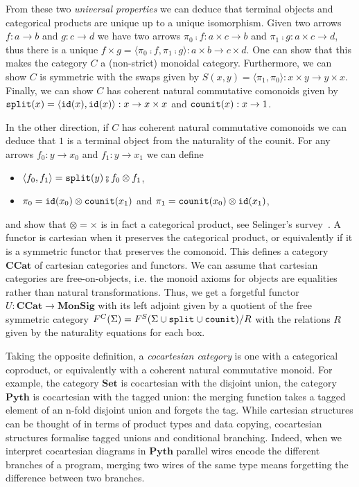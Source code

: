 From these two \emph{universal properties} we can deduce that terminal objects and categorical products are unique up to a unique isomorphism.
Given two arrows $f : a \to b$ and $g : c \to d$ we have two arrows $\pi_0 \fcmp f : a \times c \to b$ and $\pi_1 \fcmp g : a \times c \to d$, thus there is a unique $f \times  g = \langle \pi_0 \fcmp f, \pi_1 \fcmp g \rangle : a \times b \to c \times d$.
One can show that this makes the category $C$ a (non-strict) monoidal category.
Furthermore, we can show $C$ is symmetric with the swaps given by $S(x, y) = \langle \pi_1, \pi_0 \rangle : x \times y \to y \times x$.
Finally, we can show $C$ has coherent natural commutative comonoids given by $\mathtt{split}(x) = \langle \mathtt{id}(x), \mathtt{id}(x) \rangle : x \to x \times x$ and $\mathtt{counit}(x) : x \to 1$.

In the other direction, if $C$ has coherent natural commutative comonoids we can deduce that $1$ is a terminal object from the naturality of the counit.
For any arrows $f_0 : y \to x_0$ and $f_1 : y \to x_1$ we can define
\begin{itemize}
\item $\langle f_0, f_1 \rangle = \ttsplit(y) \fcmp f_0 \otimes f_1$,
\item $\pi_0 = \mathtt{id}(x_0) \otimes \mathtt{counit}(x_1)$ and $\pi_1 = \mathtt{counit}(x_0) \otimes \mathtt{id}(x_1)$,
\end{itemize}
and show that $\otimes = \times$ is in fact a categorical product, see Selinger's survey~\cite[Section 6.1]{Selinger10}.
A functor is cartesian when it preserves the categorical product, or equivalently if it is a symmetric functor that preserves the comonoid.
This defines a category $\mathbf{CCat}$ of cartesian categories and functors.
We can assume that cartesian categories are free-on-objects, i.e. the monoid axioms for objects are equalities rather than natural transformations.
Thus, we get a forgetful functor $U : \mathbf{CCat} \to \mathbf{MonSig}$ with its left adjoint given by a quotient of the free symmetric category $F^C(\Sigma) = F^S(\Sigma \cup \mathtt{split} \cup \mathtt{counit}) / R$ with the relations $R$ given by the naturality equations for each box.

Taking the opposite definition, a \emph{cocartesian category} is one with a categorical coproduct, or equivalently with a coherent natural commutative monoid.
For example, the category $\mathbf{Set}$ is cocartesian with the disjoint union, the category $\mathbf{Pyth}$ is cocartesian with the tagged union: the merging function takes a tagged element of an n-fold disjoint union and forgets the tag.
While cartesian structures can be thought of in terms of product types and data copying, cocartesian structures formalise tagged unions and conditional branching.
Indeed, when we interpret cocartesian diagrams in $\mathbf{Pyth}$ parallel wires encode the different branches of a program, merging two wires of the same type means forgetting the difference between two branches.

